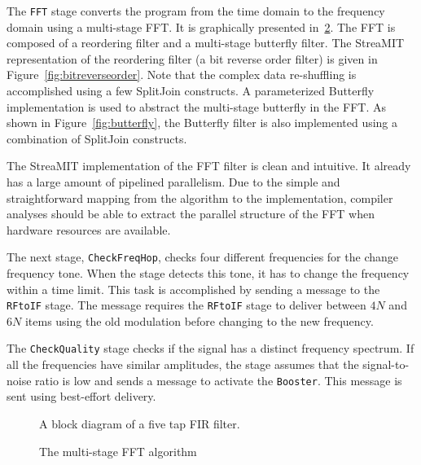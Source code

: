 The {\tt FFT} stage converts the program from the time domain to the
frequency domain using a multi-stage FFT. It is graphically presented
in~\ref{fig:fftfilter}. The FFT is composed of a reordering filter and
a multi-stage butterfly filter. The StreaMIT representation of the
reordering filter (a bit reverse order filter) is given in
Figure~\ref{fig:bitreverseorder}. Note that the complex data
re-shuffling is accomplished using a few SplitJoin constructs.  A
parameterized Butterfly implementation is used to abstract the
multi-stage butterfly in the FFT. As shown in
Figure~\ref{fig:butterfly}, the Butterfly filter is also implemented
using a combination of SplitJoin constructs.

The StreaMIT implementation of the FFT filter is clean and
intuitive. It already has a large amount of pipelined parallelism. Due
to the simple and straightforward mapping from the algorithm to the
implementation, compiler analyses should be able to extract the
parallel structure of the FFT when hardware resources are available.

The next stage, {\tt CheckFreqHop}, checks four different frequencies
for the change frequency tone. When the stage detects this tone, it
has to change the frequency within a time limit. This task is
accomplished by sending a message to the {\tt RFtoIF} stage.  The
message requires the {\tt RFtoIF} stage to deliver between $4N$ and
$6N$ items using the old modulation before changing to the new
frequency.

The {\tt CheckQuality} stage checks if the signal has a distinct
frequency spectrum. If all the frequencies have similar amplitudes,
the stage assumes that the signal-to-noise ratio is low and sends a
message to activate the {\tt Booster}. This message is sent using
best-effort delivery.

\begin{figure}[t]
\centering
{}
\caption{A block diagram of a five tap FIR filter.}
\label{fig:firfilter}
\end{figure}

\begin{figure}[t]
\centering
{}
\caption{The multi-stage FFT algorithm}
\label{fig:fftfilter}
\end{figure}